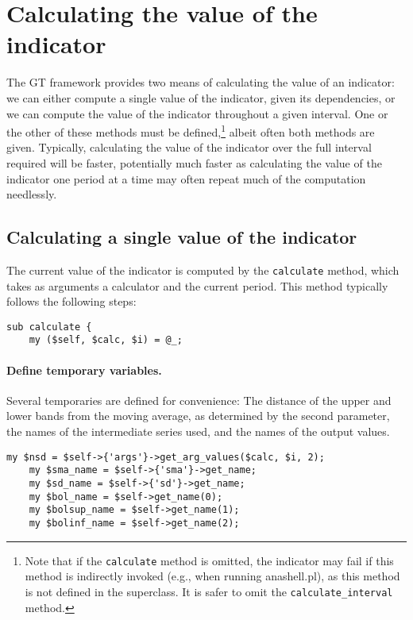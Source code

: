 \documentclass[11pt,twoside]{article}
\begin{document}
\section{Calculating the value of the indicator}
The GT framework provides two means of calculating the value of an
indicator: we can either compute a single value of the indicator, given
its dependencies, or we can compute the value of the indicator
throughout a given interval. One or the other of these methods must be
defined,\footnote{Note that if the \lstinline!calculate!
method is omitted, the indicator may fail if this method is indirectly
invoked (e.g., when running anashell.pl), as this method is not defined
in the superclass. It is safer to omit the
\lstinline!calculate_interval! method.} albeit often both
methods are given. Typically, calculating the value of the indicator
over the full interval required will be faster, potentially much faster
as calculating the value of the indicator one period at a time may
often repeat much of the computation needlessly.


\subsection{Calculating a single value of the indicator}
The current value of the indicator is computed by the
\lstinline!calculate! method, which takes as arguments a
calculator and the current period. This method typically follows the
following steps:

\begin{lstlisting}[name=example]
sub calculate {
    my ($self, $calc, $i) = @_;
\end{lstlisting}

\paragraph{Define temporary variables.}

Several temporaries are defined for convenience: The distance of the
upper and lower bands from the moving average, as determined by the
second parameter, the names of the intermediate series used, and the
names of the output values.

\begin{lstlisting}[name=example]
    my $nsd = $self->{'args'}->get_arg_values($calc, $i, 2);
    my $sma_name = $self->{'sma'}->get_name;
    my $sd_name = $self->{'sd'}->get_name;
    my $bol_name = $self->get_name(0);
    my $bolsup_name = $self->get_name(1);
    my $bolinf_name = $self->get_name(2);

\end{lstlisting}
\end{document}
